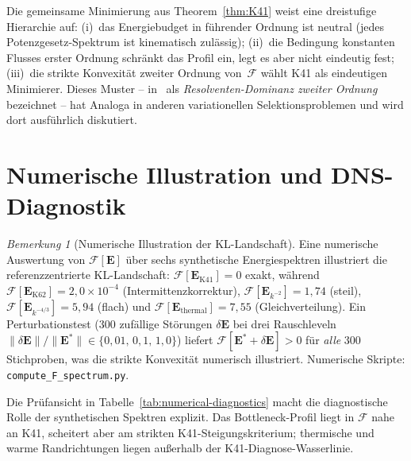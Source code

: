 \documentclass[12pt,a4paper]{article}
\theoremstyle{definition}
\theoremstyle{plain}
\theoremstyle{remark}
\newtheorem{remark}[definition]{Bemerkung}
\begin{document}
Die gemeinsame Minimierung aus Theorem~\ref{thm:K41} weist eine dreistufige
Hierarchie auf: (i)~das Energiebudget in führender Ordnung ist neutral (jedes Potenzgesetz-Spektrum ist kinematisch zulässig); (ii)~die Bedingung konstanten Flusses erster Ordnung schränkt das Profil ein, legt es aber nicht
eindeutig fest; (iii)~die strikte Konvexität zweiter Ordnung
von~$\mathcal{F}$ wählt K41 als eindeutigen Minimierer. Dieses Muster -- in~\cite{FST-Unified2026} als \emph{Resolventen-Dominanz zweiter Ordnung} bezeichnet -- hat Analoga in anderen variationellen Selektionsproblemen und wird dort ausführlich diskutiert.

\section{Numerische Illustration und DNS-Diagnostik}\label{sec:numerics}

\begin{remark}[Numerische Illustration der KL-Landschaft]\label{rem:numerical-F}
Eine numerische Auswertung von $\mathcal{F}[\mathbf{E}]$ über sechs synthetische Energiespektren illustriert die referenzzentrierte KL-Landschaft: $\mathcal{F}[\mathbf{E}_{\mathrm{K41}}] = 0$ exakt, während $\mathcal{F}[\mathbf{E}_{\mathrm{K62}}] = 2{,}0 \times 10^{-4}$ (Intermittenzkorrektur), $\mathcal{F}[\mathbf{E}_{k^{-2}}] = 1{,}74$ (steil), $\mathcal{F}[\mathbf{E}_{k^{-4/3}}] = 5{,}94$ (flach) und $\mathcal{F}[\mathbf{E}_{\mathrm{thermal}}] = 7{,}55$ (Gleichverteilung). Ein Perturbationstest ($300$ zufällige Störungen $\delta \mathbf{E}$ bei drei Rauschleveln $\|\delta \mathbf{E}\|/\|\mathbf{E}^*\| \in \{0{,}01,\, 0{,}1,\, 1{,}0\}$) liefert $\mathcal{F}[\mathbf{E}^* + \delta \mathbf{E}] > 0$ für \emph{alle} $300$ Stichproben, was die strikte Konvexität numerisch illustriert. Numerische Skripte: \texttt{compute\_F\_spectrum.py}.
\end{remark}

Die Prüfansicht in Tabelle~\ref{tab:numerical-diagnostics} macht die
diagnostische Rolle der synthetischen Spektren explizit. Das
Bottleneck-Profil liegt in $\mathcal{F}$ nahe an K41, scheitert aber am
strikten K41-Steigungskriterium; thermische und warme Randrichtungen liegen
außerhalb der K41-Diagnose-Wasserlinie.
\end{document}
